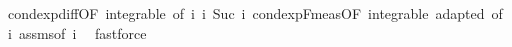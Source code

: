 \begin{isabellebody}
\ cond{\isacharunderscore}{\kern0pt}exp{\isacharunderscore}{\kern0pt}diff{\isacharbrackleft}{\kern0pt}OF\ integrable{\isacharparenleft}{\kern0pt}{}{\isacharcomma}{\kern0pt}{}{\isacharparenright}{\kern0pt}{\isacharcomma}{\kern0pt}\ of\ i\ i\ {\isachardoublequoteopen}Suc\ i{\isachardoublequoteclose}{\isacharbrackright}{\kern0pt}\ cond{\isacharunderscore}{\kern0pt}exp{\isacharunderscore}{\kern0pt}F{\isacharunderscore}{\kern0pt}meas{\isacharbrackleft}{\kern0pt}OF\ integrable\ adapted{\isacharcomma}{\kern0pt}\ of\ i{\isacharbrackright}{\kern0pt}\ assms{\isacharparenleft}{\kern0pt}{}{\isacharparenright}{\kern0pt}{\isacharbrackleft}{\kern0pt}of\ i{\isacharbrackright}{\kern0pt}\ \isamarkupfalse%
\ fastforce\isanewline
{}\isamarkupfalse%
%
\endisatagproof
{\isafoldproof}%
%
\isadelimproof
\isanewline
%
\endisadelimproof
%
\isadelimtheory
\isanewline
%
\endisadelimtheory
%
\isatagtheory
{}\isamarkupfalse%
%
\endisatagtheory
{\isafoldtheory}%
%
\isadelimtheory
%
\endisadelimtheory
%
\end{isabellebody}%
\endinput
